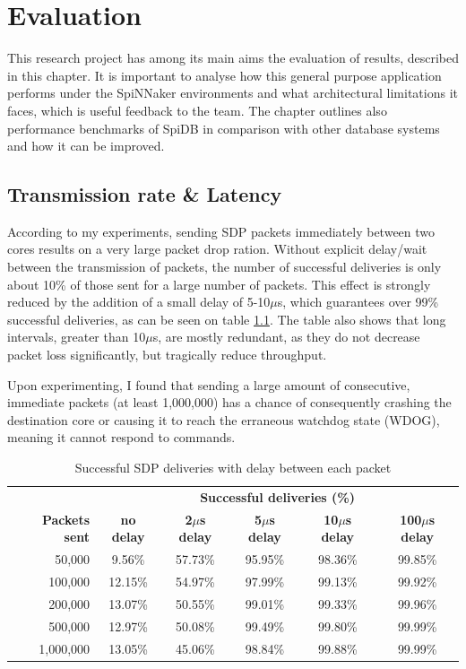 \chapter{Evaluation}
\label{cha:eval}
This research project has among its main aims the evaluation of results, described in this chapter. It is important to analyse how this general purpose application performs under the SpiNNaker environments and what architectural limitations it faces, which is useful feedback to the team. The chapter outlines also performance benchmarks of SpiDB in comparison with other database systems and how it can be improved.

\section{Transmission rate \& Latency}
\label{sec:eval_comm_rel}

According to my experiments, sending SDP packets immediately between two cores results on a very large packet drop ration. Without explicit delay/wait between the transmission of packets, the number of successful deliveries is only about 10\% of those sent for a large number of packets. This effect is strongly reduced by the addition of a small delay of 5-10$\mu$s, which guarantees over 99\% successful deliveries, as can be seen on table \ref{table:sdp_deliveries}. The table also shows that long intervals, greater than 10$\mu$s, are mostly redundant, as they do not decrease packet loss significantly, but tragically reduce throughput.

Upon experimenting, I found that sending a large amount of consecutive, immediate packets (at least 1,000,000) has a chance of consequently crashing the destination core or causing it to reach the erraneous watchdog state (WDOG), meaning it cannot respond to commands.

\begin{table}
\begin{tabular}{ r | c | c | c | c | c }
 & \multicolumn{5}{c}{\textbf{Successful deliveries (\%)}} \\

\textbf{Packets sent} & \textbf{no delay} & \textbf{2$\mu$s delay} & \textbf{5$\mu$s delay} & \textbf{10$\mu$s delay} & \textbf{100$\mu$s delay} \\
50,000 & 9.56\% & 57.73\% & 95.95\% & 98.36\% & 99.85\% \\
100,000 & 12.15\% & 54.97\% & 97.99\% & 99.13\% & 99.92\% \\
200,000 & 13.07\% & 50.55\% & 99.01\% & 99.33\% & 99.96\% \\
500,000 & 12.97\% & 50.08\% & 99.49\% & 99.80\% & 99.99\% \\
1,000,000 & 13.05\% & 45.06\% & 98.84\% & 99.88\% & 99.99\% \\
\end{tabular}
\caption{Successful SDP deliveries with delay between each packet}
\label{table:sdp_deliveries}
\end{table}

